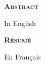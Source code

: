 \newpage
\thispagestyle{empty}
\begin{center}
	\textsc{{\bf Abstract}}
\end{center} 

In English
\begin{center}
	\textsc{{\bf Résumé}}
\end{center}

En Français